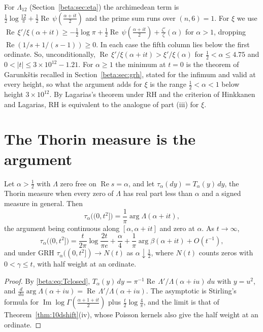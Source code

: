 \noindent For $\Lambda_{12}$ (Section~\ref{beta:sec:eta}) the archimedean term is $\tfrac12\log\frac{12}\pi+\tfrac12\operatorname{Re}\,\psi(\tfrac{\alpha+it}{2})$ and the prime sum runs over $(n,6)=1$. For $\xi$ we use $\operatorname{Re}\,\xi'/\xi(\alpha+it)\ge-\tfrac12\log\pi+\tfrac12\operatorname{Re}\,\psi(\tfrac{\alpha+it}{2})+\frac{\zeta'}{\zeta}(\alpha)$ for $\alpha>1$, dropping $\operatorname{Re}(1/s+1/(s-1))\ge0$. In each case the fifth column lies below the first ordinate. So, unconditionally, $\operatorname{Re}\,\xi'/\xi(\alpha+it)>\xi'/\xi(\alpha)$ for $\tfrac12<\alpha\le4.75$ and $0<|t|\le3\times10^{12}-1.21$. For $\alpha\ge1$ the minimum at $t=0$ is the theorem of Garunk\v{s}tis \cite{garunkstis2002} recalled in Section~\ref{beta:sec:grh}, stated for the infimum and valid at every height, so what the argument adds for $\xi$ is the range $\tfrac12<\alpha<1$ below height $3\times10^{12}$. By Lagarias's theorem under RH \cite{lagarias1999} and the criterion of Hinkkanen \cite{hinkkanen1997} and Lagarias, RH is equivalent to the analogue of part (iii) for $\xi$.


\section{The Thorin measure is the argument}\label{beta:sec:argument}

\begin{theorem}\label{beta:thm:arg}
Let $\alpha>\tfrac12$ with $\Lambda$ zero free on $\operatorname{Re} s=\alpha$, and let $\tau_\alpha(dy)=T_\alpha(y)\,dy$, the Thorin measure when every zero of $\Lambda$ has real part less than $\alpha$ and a signed measure in general. Then
\[
\tau_\alpha\bigl((0,t^2]\bigr)=\frac1\pi\arg\Lambda(\alpha+it),
\]
the argument being continuous along $[\alpha,\alpha+it]$ and zero at $\alpha$. As $t\to\infty$,
\[
\tau_\alpha\bigl((0,t^2]\bigr)=\frac{t}{2\pi}\log\frac{2t}{\pi e}+\frac\alpha4+\frac1\pi\arg\beta(\alpha+it)+O(t^{-1}),
\]
and under GRH $\tau_\alpha((0,t^2])\to N(t)$ as $\alpha\downarrow\tfrac12$, where $N(t)$ counts zeros with $0<\gamma\le t$, with half weight at an ordinate.
\end{theorem}

\begin{proof}
By \eqref{beta:eq:Tclosed}, $T_\alpha(y)\,dy=\pi^{-1}\operatorname{Re}\,\Lambda'/\Lambda(\alpha+iu)\,du$ with $y=u^2$, and $\frac{d}{du}\arg\Lambda(\alpha+iu)=\operatorname{Re}\,\Lambda'/\Lambda(\alpha+iu)$. The asymptotic is Stirling's formula for $\operatorname{Im}\log\Gamma(\tfrac{\alpha+1+it}{2})$ plus $\tfrac t2\log\frac4\pi$, and the limit is that of Theorem~\ref{thm:10dshift}(iv), whose Poisson kernels also give the half weight at an ordinate.
\end{proof}

